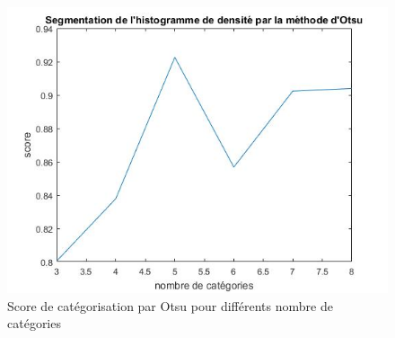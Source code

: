 \documentclass{book}
\begin{document}
\begin{figure}[H]
\begin{center}
\includegraphics[scale=0.5]{images/densite_otsu_thresholding.jpg}
\end{center}
\caption{Score de catégorisation par Otsu pour différents nombre de catégories}
\label{otsu}
\end{figure}
\clearpage
\end{document}
